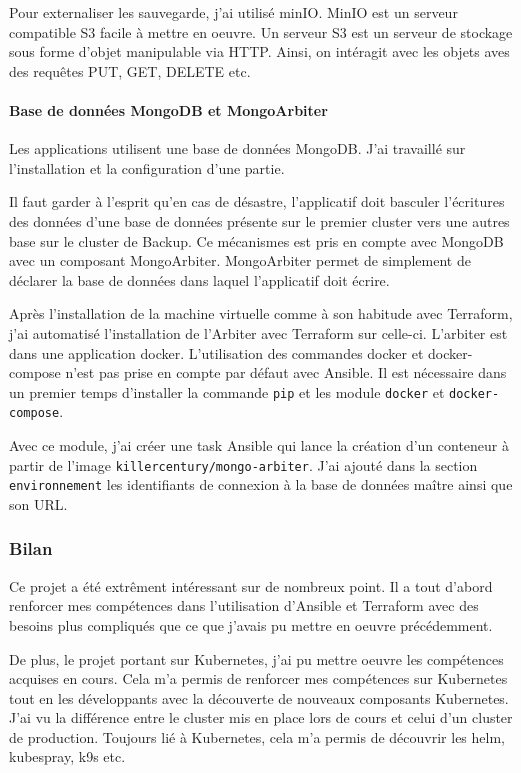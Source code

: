 \documentclass[12pt]{article}
\begin{document}
Pour externaliser les sauvegarde, j'ai utilisé minIO.
MinIO est un serveur compatible S3 facile à mettre en oeuvre.
Un serveur S3 est un serveur de stockage sous forme d'objet manipulable via HTTP.
Ainsi, on intéragit avec les objets aves des requêtes PUT, GET, DELETE etc.

\paragraph{Base de données MongoDB et MongoArbiter}
Les applications utilisent une base de données MongoDB.
J'ai travaillé sur l'installation et la configuration d'une partie.

Il faut garder à l'esprit qu'en cas de désastre, l'applicatif doit basculer l'écritures des données d'une base de données présente sur le premier cluster vers une autres base sur le cluster de Backup.
Ce mécanismes est pris en compte avec MongoDB avec un composant MongoArbiter.
MongoArbiter permet de simplement de déclarer la base de données dans laquel l'applicatif doit écrire.

Après l'installation de la machine virtuelle comme à son habitude avec Terraform, j'ai automatisé l'installation de l'Arbiter avec Terraform sur celle-ci.
L'arbiter est dans une application docker.
L'utilisation des commandes docker et docker-compose n'est pas prise en compte par défaut avec Ansible.
Il est nécessaire dans un premier temps d'installer la commande \verb|pip| et les module \verb|docker| et \verb|docker-compose|.

Avec ce module, j'ai créer une task Ansible qui lance la création d'un conteneur à partir de l'image \verb|killercentury/mongo-arbiter|.
J'ai ajouté dans la section \verb|environnement| les identifiants de connexion à la base de données maître ainsi que son URL.

\subsubsection{Bilan}
Ce projet a été extrêment intéressant sur de nombreux point.
Il a tout d'abord renforcer mes compétences dans l'utilisation d'Ansible et Terraform avec des besoins plus compliqués que ce que j'avais pu mettre en oeuvre précédemment.

De plus, le projet portant sur Kubernetes, j'ai pu mettre oeuvre les compétences acquises en cours. 
Cela m'a permis de renforcer mes compétences sur Kubernetes tout en les développants avec la découverte de nouveaux composants Kubernetes.
J'ai vu la différence entre le cluster mis en place lors de cours et celui d'un cluster de production.
Toujours lié à Kubernetes, cela m'a permis de découvrir les helm, kubespray, k9s etc.
\end{document}
